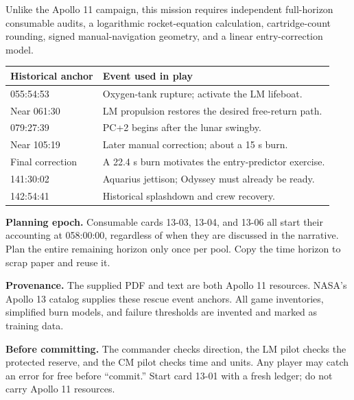 Unlike the Apollo 11 campaign, this mission requires independent
full-horizon consumable audits, a logarithmic rocket-equation
calculation, cartridge-count rounding, signed manual-navigation geometry,
and a linear entry-correction model.

\begin{tabularx}{\linewidth}{@{}lX@{}}
\toprule
Historical anchor & Event used in play\\
\midrule
055:54:53 & Oxygen-tank rupture; activate the LM lifeboat.\\
Near 061:30 & LM propulsion restores the desired free-return path.\\
079:27:39 & PC+2 begins after the lunar swingby.\\
Near 105:19 & Later manual correction; about a 15 s burn.\\
Final correction & A 22.4 s burn motivates the entry-predictor exercise.\\
141:30:02 & Aquarius jettison; Odyssey must already be ready.\\
142:54:41 & Historical splashdown and crew recovery.\\
\bottomrule
\end{tabularx}

\textbf{Planning epoch.} Consumable cards 13-03, 13-04, and 13-06 all
start their accounting at 058:00:00, regardless of when they are discussed
in the narrative. Plan the entire remaining horizon only once per pool.
Copy the time horizon to scrap paper and reuse it.

\textbf{Provenance.} The supplied PDF and text are both Apollo 11
resources. NASA's Apollo 13 catalog supplies these rescue event anchors.
All game inventories, simplified burn models, and failure thresholds
are invented and marked as training data.

\textbf{Before committing.} The commander checks direction, the LM
pilot checks the protected reserve, and the CM pilot checks time and
units. Any player may catch an error for free before ``commit.''
Start card 13-01 with a fresh ledger; do not carry Apollo 11 resources.
\fi

